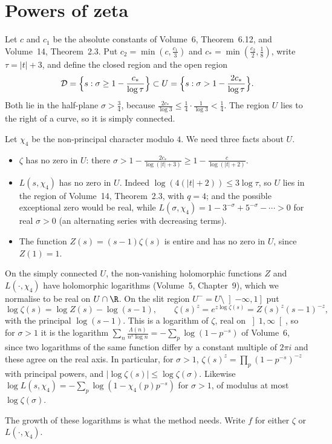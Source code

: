 \section{Powers of zeta}

Let $c$ and $c_1$ be the absolute constants of Volume~6, Theorem~6.12, and Volume~14, Theorem~2.3. Put $c_2=\min(c,\frac{c_1}3)$ and $c_*=\min(\frac{c_2}2,\frac18)$, write $\tau=|t|+3$, and define the closed region and the open region
\[
\mathcal D=\Bigl\{s:\sigma\ge1-\frac{c_*}{\log\tau}\Bigr\}\subset U=\Bigl\{s:\sigma>1-\frac{2c_*}{\log\tau}\Bigr\}.
\]
Both lie in the half-plane $\sigma>\frac34$, because $\frac{2c_*}{\log3}\le\frac14\cdot\frac1{\log 3}<\frac14$. The region $U$ lies to the right of a curve, so it is simply connected.

Let $\chi_4$ be the non-principal character modulo $4$. We need three facts about $U$.
\begin{itemize}
\item $\zeta$ has no zero in $U$: there $\sigma>1-\frac{2c_*}{\log(|t|+3)}\ge1-\frac c{\log(|t|+2)}$.
\item $L(s,\chi_4)$ has no zero in $U$. Indeed $\log(4(|t|+2))\le3\log\tau$, so $U$ lies in the region of Volume~14, Theorem~2.3, with $q=4$; and the possible exceptional zero would be real, while $L(\sigma,\chi_4)=1-3^{-\sigma}+5^{-\sigma}-\cdots>0$ for real $\sigma>0$ (an alternating series with decreasing terms).
\item The function $Z(s)=(s-1)\zeta(s)$ is entire and has no zero in $U$, since $Z(1)=1$.
\end{itemize}
On the simply connected $U$, the non-vanishing holomorphic functions $Z$ and $L(\cdot,\chi_4)$ have holomorphic logarithms (Volume~5, Chapter~9), which we normalise to be real on $U\cap\R$. On the slit region $U^-=U\setminus\left]-\infty,1\right]$ put
\[
\log\zeta(s)=\log Z(s)-\log(s-1),\qquad \zeta(s)^z=e^{z\log\zeta(s)}=Z(s)^z(s-1)^{-z},
\]
with the principal $\log(s-1)$. This is a logarithm of $\zeta$, real on $\left]1,\infty\right[$, so for $\sigma>1$ it is the logarithm $\sum_n\frac{\Lambda(n)}{n^s\log n}=-\sum_p\log(1-p^{-s})$ of Volume~6, since two logarithms of the same function differ by a constant multiple of $2\pi i$ and these agree on the real axis. In particular, for $\sigma>1$, $\zeta(s)^z=\prod_p(1-p^{-s})^{-z}$ with principal powers, and $|\log\zeta(s)|\le\log\zeta(\sigma)$. Likewise $\log L(s,\chi_4)=-\sum_p\log(1-\chi_4(p)p^{-s})$ for $\sigma>1$, of modulus at most $\log\zeta(\sigma)$.

The growth of these logarithms is what the method needs. Write $f$ for either $\zeta$ or $L(\cdot,\chi_4)$.

